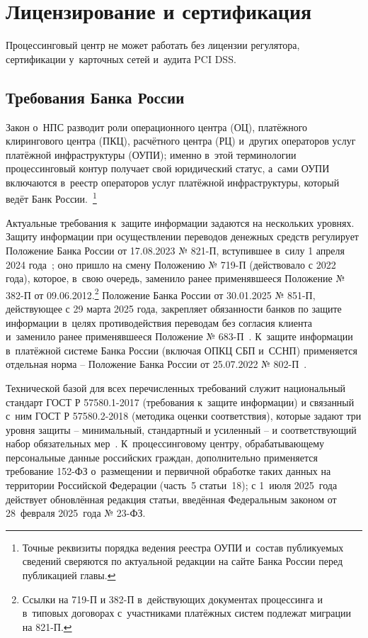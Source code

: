 \section{Лицензирование и сертификация}\label{sec:pc-licensing}

Процессинговый центр не может работать без лицензии
регулятора, сертификации у~карточных сетей и~аудита PCI DSS.

\subsection*{Требования Банка России}

Закон о~НПС разводит роли операционного центра (ОЦ),
платёжного клирингового центра (ПКЦ), расчётного центра (РЦ)
и~других операторов услуг платёжной инфраструктуры (ОУПИ);
именно в~этой терминологии процессинговый контур получает
свой юридический статус, а~сами ОУПИ включаются в~реестр
операторов услуг платёжной инфраструктуры, который ведёт
Банк России.~\cite{fz-161,cbr-ps-glossary}\footnote{Точные
реквизиты порядка ведения реестра ОУПИ и~состав публикуемых
сведений сверяются по актуальной редакции на сайте Банка
России перед публикацией главы.}

Актуальные требования к~защите информации задаются на нескольких
уровнях. Защиту информации при осуществлении переводов денежных
средств регулирует Положение Банка России от 17.08.2023 № 821-П,
вступившее в~силу 1 апреля 2024 года~\cite{cbr-821p}; оно пришло
на смену Положению № 719-П (действовало с 2022 года), которое,
в~свою очередь, заменило ранее применявшееся Положение № 382-П
от 09.06.2012.\footnote{Ссылки на 719-П и 382-П в~действующих
документах процессинга и в~типовых договорах с~участниками
платёжных систем подлежат миграции на 821-П.}
Положение Банка России от 30.01.2025 № 851-П, действующее
с 29 марта 2025 года, закрепляет обязанности банков по защите
информации в~целях противодействия переводам без согласия
клиента и~заменило ранее применявшееся
Положение № 683-П~\cite{cbr-851p}.
К~защите информации в~платёжной системе Банка России (включая
ОПКЦ СБП и~ССНП) применяется отдельная норма -- Положение
Банка России от 25.07.2022 № 802-П~\cite{cbr-802p}.

Технической базой для всех перечисленных требований служит
национальный стандарт ГОСТ Р 57580.1-2017 (требования к~защите
информации) и связанный с~ним ГОСТ Р 57580.2-2018 (методика
оценки соответствия), которые задают три уровня защиты --
минимальный, стандартный и усиленный -- и соответствующий
набор обязательных мер~\cite{gost-57580-1,gost-57580-2}.
К~процессинговому центру, обрабатывающему персональные данные
российских граждан, дополнительно применяется требование
152-ФЗ о~размещении и первичной обработке таких данных на
территории Российской Федерации (часть~5 статьи~18); с 1~июля
2025~года действует обновлённая редакция статьи, введённая
Федеральным законом от 28~февраля 2025~года № 23-ФЗ.~\cite{fz-152}

